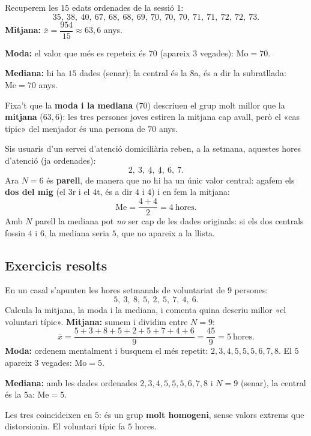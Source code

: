 \begin{exemple}
Recuperem les $15$ edats ordenades de la sessió 1:
\[
35,\ 38,\ 40,\ 67,\ 68,\ 68,\ 69,\ \underline{70},\ 70,\ 70,\ 71,\ 71,\ 72,\ 72,\ 73.
\]
\textbf{Mitjana:} $\overline{x}=\dfrac{\num{954}}{15}\approx 63,6$ anys.

\textbf{Moda:} el valor que més es repeteix és $70$ (apareix $3$ vegades): $\text{Mo}=70$.

\textbf{Mediana:} hi ha $15$ dades (senar); la central és la $8$a, és a dir la
subratllada: $\text{Me}=70$ anys.

Fixa't que la \textbf{moda i la mediana} ($70$) descriuen el grup molt millor que la
\textbf{mitjana} ($63,6$): les tres persones joves estiren la mitjana cap avall, però
el «cas típic» del menjador és una persona de $70$ anys.
\end{exemple}

\begin{exemple}
Sis usuaris d'un servei d'atenció domiciliària reben, a la setmana, aquestes hores
d'atenció (ja ordenades):
\[
2,\ 3,\ \underline{4},\ \underline{4},\ 6,\ 7.
\]
Ara $N=6$ és \textbf{parell}, de manera que no hi ha un únic valor central: agafem
els \textbf{dos del mig} (el $3$r i el $4$t, és a dir $4$ i $4$) i en fem la mitjana:
\[
\text{Me}=\frac{4+4}{2}=4\ \text{hores}.
\]
Amb $N$ parell la mediana pot \emph{no} ser cap de les dades originals: si els dos
centrals fossin $4$ i $6$, la mediana seria $5$, que no apareix a la llista.
\end{exemple}

\subsection{Exercicis resolts}

\begin{exresolt}
En un casal s'apunten les hores setmanals de voluntariat de $9$ persones:
\[
5,\ 3,\ 8,\ 5,\ 2,\ 5,\ 7,\ 4,\ 6.
\]
Calcula la mitjana, la moda i la mediana, i comenta quina descriu millor «el
voluntari típic».
\solucio
\textbf{Mitjana:} sumem i dividim entre $N=9$:
\[
\overline{x}=\frac{5+3+8+5+2+5+7+4+6}{9}=\frac{45}{9}=5\ \text{hores}.
\]
\textbf{Moda:} ordenem mentalment i busquem el més repetit:
$2,3,4,5,5,5,6,7,8$. El $5$ apareix $3$ vegades: $\text{Mo}=5$.

\textbf{Mediana:} amb les dades ordenades $2,3,4,5,\underline{5},5,6,7,8$ i $N=9$
(senar), la central és la $5$a: $\text{Me}=5$.

Les tres coincideixen en $5$: és un grup \textbf{molt homogeni}, sense valors
extrems que distorsionin. El voluntari típic fa $5$ hores.
\end{exresolt}

